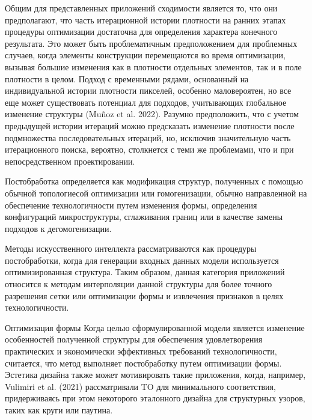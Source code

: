 Общим для представленных приложений сходимости является то, что они предполагают, что часть итерационной истории плотности на ранних этапах процедуры оптимизации достаточна для определения характера конечного результата. Это может быть проблематичным предположением для проблемных случаев, когда элементы конструкции перемещаются во время оптимизации, вызывая большие изменения как в плотности отдельных элементов, так и в поле плотности в целом. Подход с временными рядами, основанный на индивидуальной истории плотности пикселей, особенно маловероятен, но все еще может существовать потенциал для подходов, учитывающих глобальное изменение структуры (Muñoz et al. 2022). Разумно предположить, что с учетом предыдущей истории итераций можно предсказать изменение плотности после подмножества последовательных итераций, но, исключив значительную часть итерационного поиска, вероятно, столкнется с теми же проблемами, что и при непосредственном проектировании.






Постобработка определяется как модификация структур, полученных с помощью обычной топологиесой оптимизации или гомогенизации, обычно направленной на обеспечение технологичности путем изменения формы, определения конфигураций микроструктуры, сглаживания границ или в качестве замены подходов к дегомогенизации.

Методы искусственного интеллекта рассматриваются как процедуры постобработки, когда для генерации входных данных модели используется оптимизированная структура. Таким образом, данная категория приложений относится к методам интерполяции данной структуры для более точного разрешения сетки или оптимизации формы и извлечения признаков в целях технологичности.

Оптимизация формы Когда целью сформулированной модели является изменение особенностей полученной структуры для обеспечения удовлетворения практических и экономически эффективных требований технологичности, считается, что метод выполняет постобработку путем оптимизации формы. Эстетика дизайна также может мотивировать такие приложения, когда, например, Vulimiri et al. (2021) рассматривали TO для минимального соответствия, придерживаясь при этом некоторого эталонного дизайна для структурных узоров, таких как круги или паутина.

